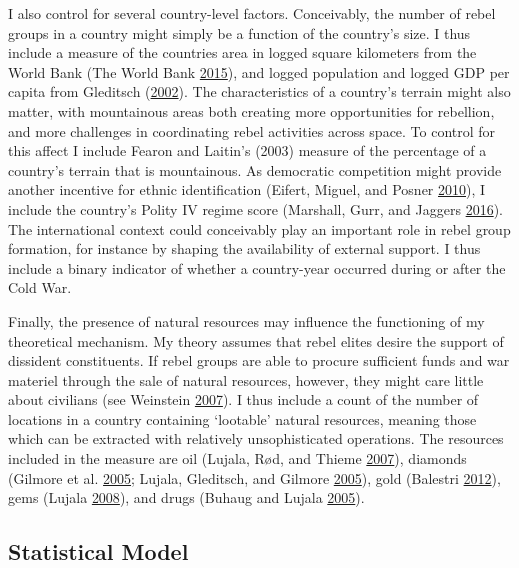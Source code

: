 \documentclass[12pt,]{book}
\theoremstyle{definition}
\theoremstyle{definition}
\theoremstyle{definition}
\theoremstyle{remark}
\begin{document}
I also control for several country-level factors. Conceivably, the
number of rebel groups in a country might simply be a function of the
country's size. I thus include a measure of the countries area in logged
square kilometers from the World Bank (The World Bank
\protect\hyperlink{ref-WorldBank2015}{2015}), and logged population and
logged GDP per capita from Gleditsch
(\protect\hyperlink{ref-Gleditsch2002b}{2002}). The characteristics of a
country's terrain might also matter, with mountainous areas both
creating more opportunities for rebellion, and more challenges in
coordinating rebel activities across space. To control for this affect I
include Fearon and Laitin's (2003) measure of the percentage of a
country's terrain that is mountainous. As democratic competition might
provide another incentive for ethnic identification (Eifert, Miguel, and
Posner \protect\hyperlink{ref-Eifert2010}{2010}), I include the
country's Polity IV regime score (Marshall, Gurr, and Jaggers
\protect\hyperlink{ref-Marshall2016}{2016}). The international context
could conceivably play an important role in rebel group formation, for
instance by shaping the availability of external support. I thus include
a binary indicator of whether a country-year occurred during or after
the Cold War.

Finally, the presence of natural resources may influence the functioning
of my theoretical mechanism. My theory assumes that rebel elites desire
the support of dissident constituents. If rebel groups are able to
procure sufficient funds and war materiel through the sale of natural
resources, however, they might care little about civilians (see
Weinstein \protect\hyperlink{ref-Weinstein2007}{2007}). I thus include a
count of the number of locations in a country containing `lootable'
natural resources, meaning those which can be extracted with relatively
unsophisticated operations. The resources included in the measure are
oil (Lujala, Rød, and Thieme \protect\hyperlink{ref-Lujala2007}{2007}),
diamonds (Gilmore et al. \protect\hyperlink{ref-Gilmore2007}{2005};
Lujala, Gleditsch, and Gilmore
\protect\hyperlink{ref-Lujala2005}{2005}), gold (Balestri
\protect\hyperlink{ref-Balestri2012}{2012}), gems (Lujala
\protect\hyperlink{ref-Lujala2008}{2008}), and drugs (Buhaug and Lujala
\protect\hyperlink{ref-Buhaug2005}{2005}).

\hypertarget{statistical-model}{%
\subsection{Statistical Model}\label{statistical-model}}
\end{document}
